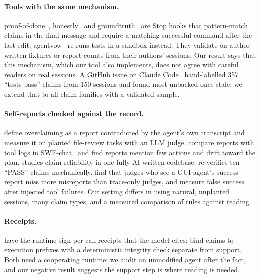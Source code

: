\documentclass[11pt]{article}
\begin{document}
\paragraph{Tools with the same mechanism.} proof-of-done~\citep{boyko2026proofofdone}, honestly~\citep{honestly2026}
and groundtruth~\citep{groundtruth2026} are Stop hooks that pattern-match claims in the final message and require
a matching successful command after the last edit; agentvow~\citep{agentvow2026} re-runs tests in a sandbox
instead. They validate on author-written fixtures or report counts from their authors' sessions. Our result says
that this mechanism, which our tool also implements, does not agree with careful readers on real sessions. A
GitHub issue on Claude Code~\citep{ashwinsuriya2026issue} hand-labelled 357 ``tests pass'' claims from 150
sessions and found most unbacked ones stale; we extend that to all claim families with a validated sample.

\paragraph{Self-reports checked against the record.} \citet{smyth2026overclaiming} define overclaiming as a
report contradicted by the agent's own transcript and measure it on planted file-review tasks with an LLM judge.
\citet{kraishan2026plans} compare reports with tool logs in SWE-chat~\citep{baumann2026swechat} and find reports
mention few actions and drift toward the plan. \citet{leith2026commits} studies claim reliability in one fully
AI-written codebase; \citet{lei2026pass} re-verifies ten ``PASS'' claims mechanically. \citet{zhu2026whoverifies}
find that judges who see a GUI agent's success report miss more misreports than trace-only judges, and
\citet{zhu2026failure} measure false success after injected tool failures. Our setting differs in using natural,
unplanted sessions, many claim types, and a measured comparison of rules against reading.

\paragraph{Receipts.} \citet{basu2026receipts} have the runtime sign per-call receipts that the model cites;
\citet{hu2026actions} bind claims to execution prefixes with a deterministic integrity check separate from
support. Both need a cooperating runtime; we audit an unmodified agent after the fact, and our negative result
suggests the support step is where reading is needed.
\end{document}
